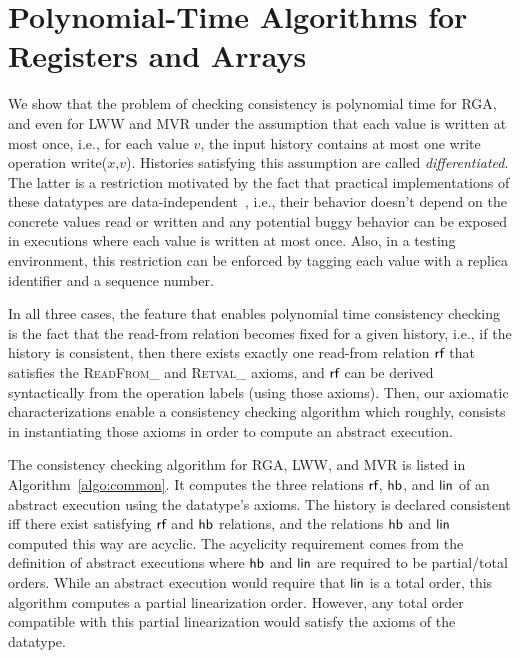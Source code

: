 
\section{Polynomial-Time Algorithms for Registers and Arrays}
\label{sec:algorithms}

We show that the problem of checking consistency is polynomial time for RGA, and even for LWW and MVR under the assumption that each value is written at most once, i.e., for each value $v$, the input history contains at most one write operation {\sf write}($x$,$v$). Histories satisfying this assumption are called \emph{differentiated}. The latter is a restriction motivated by the fact that practical implementations of these datatypes are data-independent~\cite{DBLP:conf/popl/Wolper86}, i.e., their behavior doesn't depend on the concrete values read or written and any potential buggy behavior can be exposed in executions where each value is written at most once. Also, in a testing environment, this restriction can be enforced by tagging each value with a replica identifier and a sequence number.

In all three cases, the feature that enables polynomial time consistency checking is the fact that the read-from relation becomes fixed for a given history, i.e., if the history is consistent, then there exists exactly one read-from relation $\textsf{rf}$ that satisfies the \textsc{ReadFrom\_} and \textsc{Retval\_} axioms, and $\textsf{rf}$ can be derived syntactically from the operation labels (using those axioms). Then, our axiomatic characterizations enable a consistency checking algorithm which roughly, consists in instantiating those axioms in order to compute an abstract execution.

\begin{algorithm}[t]
  {\footnotesize}
  \caption{Consistency checking for RGA, LWW, and MVR. \textsc{Re\ldots}[$T$] refers to an axiom of $T$, or $\mathit{true}$ when $T$ lacks such an axiom. The relation $R^+$ denotes the transitive closure of $R$.
\vspace{-1.5em}
 }
  \label{algo:common}
\end{algorithm}

The consistency checking algorithm for RGA, LWW, and MVR is listed in Algorithm~\ref{algo:common}. It computes the three relations $\textsf{rf}$, $\textsf{hb}$, and $\mathsf{lin}$ of an abstract execution using the datatype's axioms. The history is declared consistent iff there exist satisfying $\textsf{rf}$ and $\textsf{hb}$ relations, and the relations $\textsf{hb}$ and $\mathsf{lin}$ computed this way are acyclic. The acyclicity requirement comes from the definition of abstract executions where $\textsf{hb}$ and $\mathsf{lin}$ are required to be partial/total orders.
While an abstract execution would require that $\mathsf{lin}$ is a total order, this algorithm computes a partial linearization order. However, any total order compatible with this partial linearization would satisfy the axioms of the datatype.

